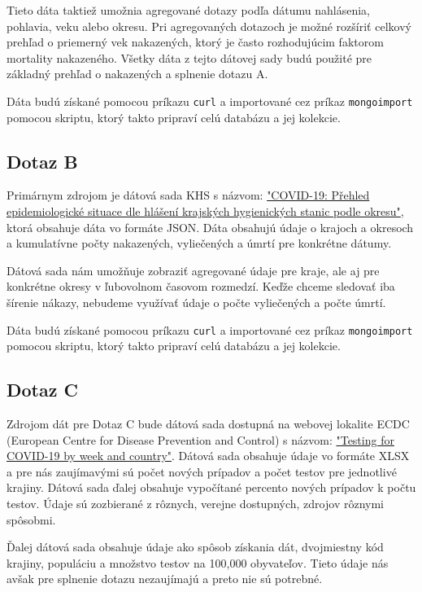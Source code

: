 \documentclass[11pt, a4paper]{article}
\begin{document}
\hfill \break
Tieto dáta taktiež umožnia agregované dotazy podľa dátumu nahlásenia, pohlavia, veku alebo okresu. Pri agregovaných dotazoch je možné rozšíriť celkový prehľad o priemerný vek nakazených, ktorý je často rozhodujúcim faktorom mortality nakazeného. Všetky dáta z tejto dátovej sady budú použité pre základný prehľad o nakazených a splnenie dotazu A.

\hfill \break
Dáta budú získané pomocou príkazu \texttt{curl} a importované cez príkaz \texttt{mongoimport} pomocou skriptu, ktorý takto pripraví celú databázu a jej kolekcie.
\subsection*{Dotaz B}
Primárnym zdrojom je dátová sada KHS s názvom: \href{https://onemocneni-aktualne.mzcr.cz/api/v2/covid-19}{"COVID-19: Přehled epidemiologické situace dle hlášení krajských hygienických stanic podle okresu"}, ktorá obsahuje dáta vo formáte JSON. Dáta obsahujú údaje o krajoch a okresoch a kumulatívne počty nakazených, vyliečených a úmrtí pre konkrétne dátumy.

\hfill \break
Dátová sada nám umožňuje zobraziť agregované údaje pre kraje, ale aj pre konkrétne okresy v ľubovolnom časovom rozmedzí. Keďže chceme sledovať iba šírenie nákazy, nebudeme využívať údaje o počte vyliečených a počte úmrtí.

\hfill \break
Dáta budú získané pomocou príkazu \texttt{curl} a importované cez príkaz \texttt{mongoimport} pomocou skriptu, ktorý takto pripraví celú databázu a jej kolekcie.

\subsection*{Dotaz C}
Zdrojom dát pre Dotaz C bude dátová sada dostupná na webovej lokalite ECDC (European Centre for Disease Prevention and Control) s názvom: \href{https://www.ecdc.europa.eu/en/publications-data/covid-19-testing}{"Testing for COVID-19 by week and country"}. Dátová sada obsahuje údaje vo formáte XLSX a pre nás zaujímavými sú počet nových prípadov a počet testov pre jednotlivé krajiny. Dátová sada ďalej obsahuje vypočítané percento nových prípadov k počtu testov. Údaje sú zozbierané z rôznych, verejne dostupných, zdrojov rôznymi spôsobmi. 

\hfill \break
Ďalej dátová sada obsahuje údaje ako spôsob získania dát, dvojmiestny kód krajiny, populáciu a množstvo testov na 100,000 obyvateľov. Tieto údaje nás avšak pre splnenie dotazu nezaujímajú a preto nie sú potrebné.
\end{document}
